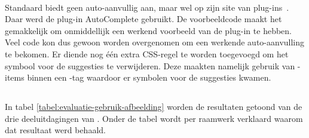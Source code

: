 \paragraph{\lungo}
Standaard biedt \lungo{} geen auto-aanvullig aan, maar wel op zijn site van plug-ins~\cite{TapQuo2013b}.
Daar werd de plug-in AutoComplete gebruikt.
De voorbeeldcode maakt het gemakkelijk om onmiddellijk een werkend voorbeeld van de plug-in te hebben.
Veel code kon dus gewoon worden overgenomen om een werkende auto-aanvulling te bekomen.
Er diende nog één extra CSS-regel te worden toegevoegd om het symbool voor de suggesties te verwijderen.
Deze maakten namelijk gebruik van -items binnen een -tag waardoor er symbolen voor de suggesties kwamen.



\subsection{}
\label{sec:evaluatie-gebruik-afbeelding}

In tabel \ref{tabel:evaluatie-gebruik-afbeelding} worden de resultaten getoond van de drie deeluitdagingen van .
Onder de tabel wordt per raamwerk verklaard waarom dat resultaat werd behaald.

\begin{table}[H]
\centering
{}
\caption{Gebruik van  voor \st{}~(\sta), \kendo{}~(\kendoa), \jqm{}~(\jqma) en \lungo{}~(\lungoa).}
\label{tabel:evaluatie-gebruik-afbeelding}
\end{table}

